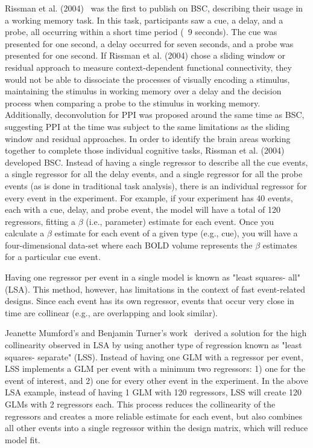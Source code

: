 \documentclass[phd,figures,tables,ackpage,abstractpage,publicabstractpage]{uithesis}
\begin{document}
Rissman et al. (2004)~\cite{Rissman2004} was the first to publish on BSC,
describing their usage in a working memory task.
In this task, participants saw a cue, a delay, and a probe, all occurring
within a short time period (~9 seconds).
The cue was presented for one second, a delay occurred for seven seconds,
and a probe was presented for one second.
If Rissman et al. (2004) chose a sliding window or residual approach to measure context-dependent functional connectivity,
they would not be able to dissociate the processes of visually encoding a stimulus,
maintaining the stimulus in working memory over a delay and the decision process when comparing a
probe to the stimulus in working memory.
Additionally, deconvolution for PPI was proposed around the same time as BSC,
suggesting PPI at the time was subject to the same limitations as
the sliding window and residual approaches.
In order to identify the brain areas working together to complete those individual cognitive tasks,
Rissman et al. (2004) developed BSC.
Instead of having a single regressor to describe all the cue events,
a single regressor for all the delay events, and a single regressor for all the
probe events (as is done in traditional task analysis),
there is an individual regressor for every event in the experiment.
For example, if your experiment has 40 events, each with a cue, delay, and
probe event, the model will have a total of 120 regressors, fitting a $\beta$
(i.e., parameter) estimate for each event.
Once you calculate a $\beta$ estimate for each event of a given type
(e.g., cue), you will have a four-dimensional data-set where each BOLD volume
represents the $\beta$ estimates for a particular cue event.

Having one regressor per event in a single model is known as "least squares- all" (LSA).
This method, however, has limitations in the context of fast event-related
designs.
Since each event has its own regressor, events that occur very close in time
are collinear (e.g., are overlapping and look similar).

Jeanette Mumford's and Benjamin Turner's work~\cite{Turner2010,Mumford2012} derived a solution for
the high collinearity observed in LSA by using another
type of regression known as "least squares- separate" (LSS).
Instead of having one GLM with a regressor per event,
LSS implements a GLM per event with a minimum two regressors:
1) one for the event of interest, and 2) one for every other event in the
experiment.
In the above LSA example, instead of having 1 GLM with 120 regressors,
LSS will create 120 GLMs with 2 regressors each.
This process reduces the collinearity of the regressors and creates a more reliable
estimate for each event, but also combines all other events into a single regressor
within the design matrix, which will reduce model fit.
\end{document}
